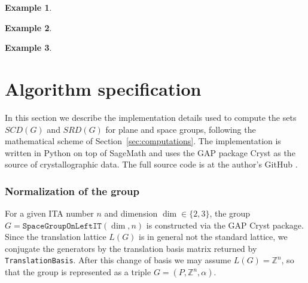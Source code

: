 \documentclass[draft]{adm-paper}
\newcommand{\minus}{\scalebox{0.75}[1.0]{$-$}}
\theoremstyle{definition}
\newtheorem{example}{Example}
\begin{document}

\begin{example}

\end{example}


\begin{example}

\end{example}


\begin{example}

\end{example}


\section{Algorithm specification}

In this section we describe the implementation details used to compute the sets $SCD(G)$ and $SRD(G)$ for plane
and space groups, following the mathematical scheme of Section~\ref{sec:computations}. The implementation is written in
Python on top of SageMath \cite{SageMath} and uses the GAP package Cryst
\cite{GAP:Cryst} as the source of crystallographic data. The full source code is at the author's GitHub \cite{crystcode2026}.

\subsubsection*{Normalization of the group}

For a given ITA number $n$ and dimension $\dim \in \{2,3\}$, the group
$G = \texttt{SpaceGroupOnLeftIT}(\dim, n)$ is constructed via the GAP Cryst
package. Since the translation lattice $L(G)$ is in general not the standard
lattice, we conjugate the generators by the translation basis matrix returned by \texttt{TranslationBasis}.
After this change of basis we may assume $L(G) = \mathbb{Z}^n$, so that the group is represented as a triple
$G = (P, \mathbb{Z}^n, \alpha)$.
\end{document}
